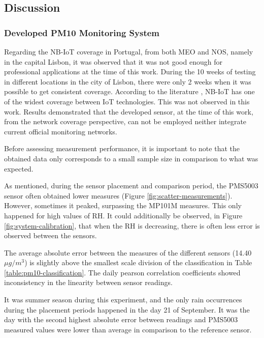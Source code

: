\subsection{Discussion}


\subsubsection{Developed PM10 Monitoring System}

Regarding the NB-IoT coverage in Portugal, from both MEO and NOS, namely in the capital Lisbon, it was observed that it was not good enough for professional applications at the time of this work. During the 10 weeks of testing in different locations in the city of Lisbon, there were only 2 weeks when it was possible to get consistent coverage. According to the literature \cite{Lauridsen2017}, NB-IoT has one of the widest coverage between IoT technologies. This was not observed in this work. Results demonstrated that the developed sensor, at the time of this work, from the network coverage perspective, can not be employed neither integrate current official monitoring networks.

Before assessing measurement performance, it is important to note that the obtained data only corresponds to a small sample size in comparison to what was expected.


As mentioned, during the sensor placement and comparison period, the PMS5003 sensor often obtained lower measures (Figure \ref{fig:scatter-measurements}). However, sometimes it peaked, surpassing the MP101M measures. This only happened for high values of RH. It could additionally be observed, in Figure \ref{fig:system-calibration}, that when the RH is decreasing, there is often less error is observed between the sensors.

The average absolute error between the measures of the different sensors (14.40 $\mu g/m^3$) is slightly above the smallest scale division of the classification in Table \ref{table:pm10-classification}. The daily pearson correlation coefficients showed inconsistency in the linearity between sensor readings.

It was summer season during this experiment, and the only rain occurrences during the placement periods happened in the day 21 of September. It was the day with the second highest absolute error between readings and PMS5003 measured values were lower than average in comparison to the reference sensor.

